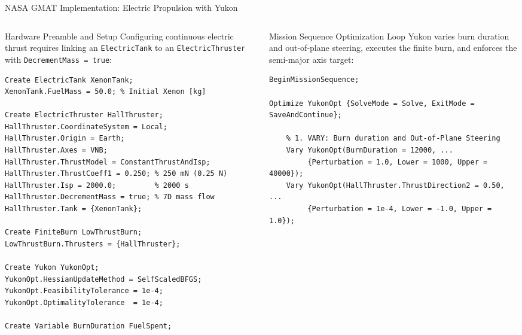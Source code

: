 \documentclass[aspectratio=169, 10pt]{beamer}
\begin{document}
\begin{frame}[fragile]{NASA GMAT Implementation: Electric Propulsion with Yukon}
    \begin{columns}[T]
        \begin{column}{0.49\textwidth}
            \begin{block}{Hardware Preamble and Setup}
                \scriptsize
                Configuring continuous electric thrust requires linking an \texttt{ElectricTank} to an \texttt{ElectricThruster} with \texttt{DecrementMass = true}:
            \end{block}
\begin{lstlisting}[style=gmatstyle]
Create ElectricTank XenonTank;
XenonTank.FuelMass = 50.0; % Initial Xenon [kg]

Create ElectricThruster HallThruster;
HallThruster.CoordinateSystem = Local;
HallThruster.Origin = Earth;
HallThruster.Axes = VNB;
HallThruster.ThrustModel = ConstantThrustAndIsp;
HallThruster.ThrustCoeff1 = 0.250; % 250 mN (0.25 N)
HallThruster.Isp = 2000.0;         % 2000 s
HallThruster.DecrementMass = true; % 7D mass flow
HallThruster.Tank = {XenonTank};

Create FiniteBurn LowThrustBurn;
LowThrustBurn.Thrusters = {HallThruster};

Create Yukon YukonOpt;
YukonOpt.HessianUpdateMethod = SelfScaledBFGS;
YukonOpt.FeasibilityTolerance = 1e-4;
YukonOpt.OptimalityTolerance  = 1e-4;

Create Variable BurnDuration FuelSpent;
\end{lstlisting}
        \end{column}

        \begin{column}{0.49\textwidth}
            \begin{block}{Mission Sequence Optimization Loop}
                \scriptsize
                Yukon varies burn duration and out-of-plane steering, executes the finite burn, and enforces the semi-major axis target:
            \end{block}
\begin{lstlisting}[style=gmatstyle]
BeginMissionSequence;

Optimize YukonOpt {SolveMode = Solve, ExitMode = SaveAndContinue};

    % 1. VARY: Burn duration and Out-of-Plane Steering
    Vary YukonOpt(BurnDuration = 12000, ...
         {Perturbation = 1.0, Lower = 1000, Upper = 40000});
    Vary YukonOpt(HallThruster.ThrustDirection2 = 0.50, ...
         {Perturbation = 1e-4, Lower = -1.0, Upper = 1.0});


\end{lstlisting}
\end{column}
\end{columns}
\end{frame}
\end{document}
